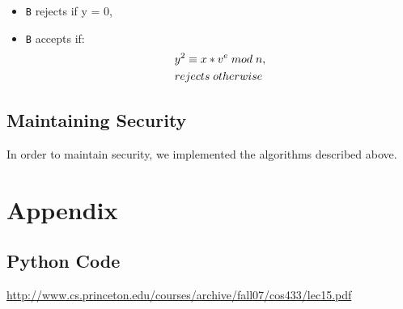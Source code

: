 \documentclass[10pt]{article}
\begin{document}
\begin{itemize}
    \item \texttt{B} rejects if y = 0,
    \item \texttt{B} accepts if:
        \begin{align*}
            & y^{2} \equiv x*v^{e} \thickspace mod \thickspace n, \\
            & rejects \thickspace otherwise
        \end{align*}
\end{itemize}


\subsection{Maintaining Security}
In order to maintain security, we implemented the algorithms described above.

\newpage
\section{Appendix}
    \subsection{Python Code}
    
    
    
    
    
    
    
    
    
    

\newpage
\begin{thebibliography}{9}
     \url{http://www.cs.princeton.edu/courses/archive/fall07/cos433/lec15.pdf}
\end{thebibliography}
\end{document}
